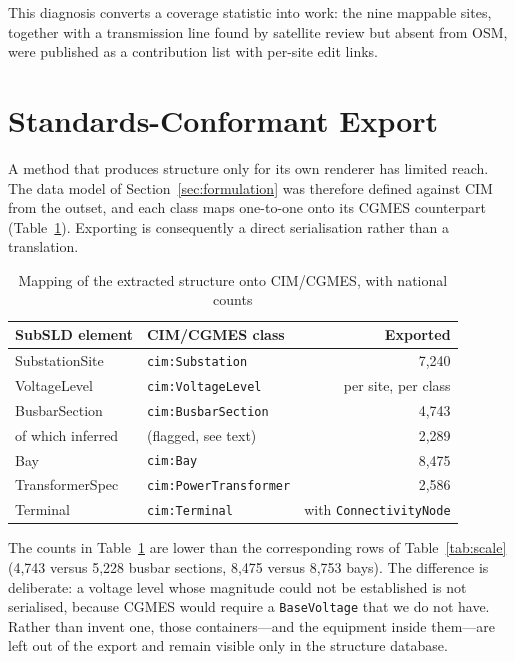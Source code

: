 \documentclass[journal]{IEEEtran}
\begin{document}
This diagnosis converts a coverage statistic into work: the nine mappable sites,
together with a transmission line found by satellite review but absent from OSM,
were published as a contribution list with per-site edit links.

\section{Standards-Conformant Export}\label{sec:cim}

A method that produces structure only for its own renderer has limited reach.
The data model of Section~\ref{sec:formulation} was therefore defined against
CIM from the outset, and each class maps one-to-one onto its CGMES counterpart
(Table~\ref{tab:cim}). Exporting is consequently a direct serialisation rather
than a translation.

\begin{table}[t]
\caption{Mapping of the extracted structure onto CIM/CGMES, with national counts}
\label{tab:cim}
\centering
\begin{tabular}{llr}
\toprule
SubSLD element & CIM/CGMES class & Exported \\
\midrule
SubstationSite   & \texttt{cim:Substation}      & 7{,}240 \\
VoltageLevel     & \texttt{cim:VoltageLevel}    & per site, per class \\
BusbarSection    & \texttt{cim:BusbarSection}   & 4{,}743 \\
\quad of which inferred & (flagged, see text)   & 2{,}289 \\
Bay              & \texttt{cim:Bay}             & 8{,}475 \\
TransformerSpec  & \texttt{cim:PowerTransformer} & 2{,}586 \\
Terminal         & \texttt{cim:Terminal}        & with \texttt{ConnectivityNode} \\
\bottomrule
\end{tabular}
\end{table}

The counts in Table~\ref{tab:cim} are lower than the corresponding rows of
Table~\ref{tab:scale} (4{,}743 versus 5{,}228 busbar sections, 8{,}475 versus
8{,}753 bays). The difference is deliberate: a voltage level whose magnitude
could not be established is not serialised, because CGMES would require a
\texttt{BaseVoltage} that we do not have. Rather than invent one, those
containers---and the equipment inside them---are left out of the export and
remain visible only in the structure database.
\end{document}
